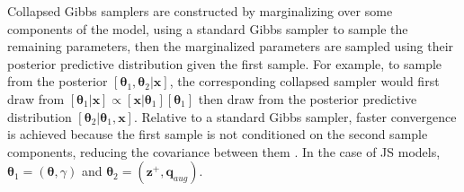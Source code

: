 \documentclass[11pt]{article}
\newcommand{\bx}{\ensuremath{\mathbf{x}}}
\newcommand{\bz}{\ensuremath{\mathbf{z}}}
\newcommand{\bt}{\ensuremath{\boldsymbol{\theta}}}
\newcommand{\bvt}{\ensuremath{\boldsymbol{\vartheta}}}
\newcommand{\bq}{\ensuremath{\mathbf{q}}}
\begin{document}
Collapsed Gibbs samplers are constructed by marginalizing over some components of the model, using a standard Gibbs sampler to sample the remaining parameters, then the marginalized parameters are sampled using their posterior predictive distribution given the first sample. For example, to sample from the posterior $[\bt_1,\bt_2|\bx]$, the corresponding collapsed sampler would first draw from $[\bt_1|\bx]\propto [\bx|\bt_1][\bt_1]$ then draw from the posterior predictive distribution $[\bt_2|\bt_1,\bx]$. Relative to a standard Gibbs sampler, faster convergence is achieved because the first sample is not conditioned on the second sample components, reducing the covariance between them \citep{Liu1994a}. In the case of JS models, $\bt_1 = (\bt, \gamma)$ and $\bt_2 = (\bz^+, \bq_{aug})$.



%
%
\end{document}
